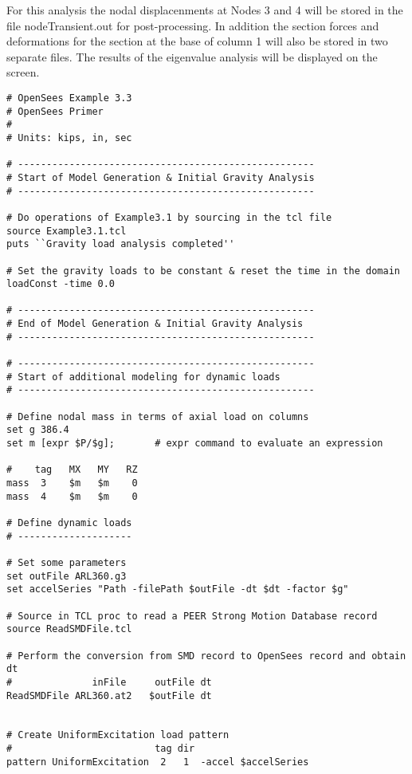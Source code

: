 \documentclass[12pt]{article}
\begin{document}
\vspace{0.2in} 

For this analysis the nodal displacenments at Nodes 3 and 4 will be stored in
the file nodeTransient.out for post-processing. In addition the
section forces and deformations for the section at the base of column
1 will also be stored in two separate files.  The results of the
eigenvalue analysis will be displayed on the screen.

\vspace{0.2in} 

{\sf\small
\begin{verbatim}
# OpenSees Example 3.3
# OpenSees Primer
#
# Units: kips, in, sec

# ----------------------------------------------------
# Start of Model Generation & Initial Gravity Analysis
# ----------------------------------------------------

# Do operations of Example3.1 by sourcing in the tcl file
source Example3.1.tcl
puts ``Gravity load analysis completed''

# Set the gravity loads to be constant & reset the time in the domain
loadConst -time 0.0

# ----------------------------------------------------
# End of Model Generation & Initial Gravity Analysis
# ----------------------------------------------------

# ----------------------------------------------------
# Start of additional modeling for dynamic loads
# ----------------------------------------------------

# Define nodal mass in terms of axial load on columns
set g 386.4
set m [expr $P/$g];       # expr command to evaluate an expression

#    tag   MX   MY   RZ
mass  3    $m   $m    0
mass  4    $m   $m    0

# Define dynamic loads
# --------------------

# Set some parameters
set outFile ARL360.g3
set accelSeries "Path -filePath $outFile -dt $dt -factor $g"

# Source in TCL proc to read a PEER Strong Motion Database record
source ReadSMDFile.tcl

# Perform the conversion from SMD record to OpenSees record and obtain dt
#              inFile     outFile dt
ReadSMDFile ARL360.at2   $outFile dt


# Create UniformExcitation load pattern
#                         tag dir 
pattern UniformExcitation  2   1  -accel $accelSeries


\end{verbatim}}
\end{document}

